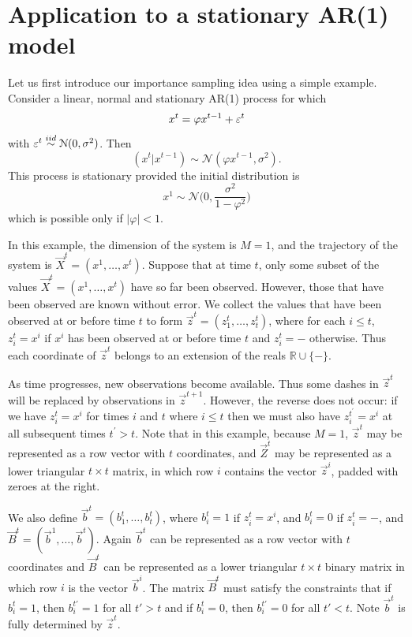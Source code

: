 \section{Application to a stationary AR(1) model}
\label{sec:3}

Let us first introduce our importance sampling idea using a simple example. Consider a linear, normal and stationary AR(1) process for which
\begin{equation*}
    x^{t} = \varphi x^{t-1} + \varepsilon^{t}
\end{equation*}
with $\varepsilon^{t} \stackrel{iid}{\sim} \mathcal{N}(0, \sigma^{2})$. Then
\begin{equation*}
    (x^{t} | x^{t-1}) \sim \mathcal{N} (\varphi x^{t-1}, \sigma^{2}).
\end{equation*}
This process is stationary provided the initial distribution is
\begin{equation*}
    x^{1} \sim \mathcal{N} \Bigg (0, \frac{\sigma^2}{1- \varphi^2} \Bigg )
\end{equation*}
which is possible only if $|\varphi| < 1$. 

In this example, the dimension of the system is $M = 1$, and the trajectory of the system is $\vec {X}^{t} = (x^1, \dots, x^{t})$. Suppose that at time $t$, only some subset of the values $\vec {X}^{t} = (x^1, \dots, x^{t})$ have so far been observed. However, those that have been observed are known without error. We collect the values that have been observed at or before time $t$ to form $\vec{z}^{t} = (z_1^{t}, \dots, z_{t}^{t})$, where for each $i \leq t$, $z_i^{t} = x^i$ if $x^i$ has been observed at or before time $t$ and $z_i^{t} = -$ otherwise. Thus each coordinate of $\vec{z}^{t}$ belongs to an extension of the reals $\mathbb{R} \cup \{ - \}$. 

As time progresses, new observations become available. Thus some dashes in $\vec{z}^{t}$ will be replaced by observations in $\vec{z}^{t+1}$. However, the reverse does not occur: if we have $z_i^{t} = x^i$ for times $i$ and $t$ where $i \leq t$ then we must also have $z_i^{t^{\prime}} = x^i$ at all subsequent times $t^{\prime} > t$. Note that in this example, because $M=1$, $\vec{z}^{t}$ may be represented as a row vector with $t$ coordinates, and $\vec{Z}^{t}$ may be represented as a lower triangular $t \times t$ matrix, in which row $i$ contains the vector $\vec{z}^{i}$, padded with zeroes at the right.

We also define $\vec{b}^{t} = (b_1^{t}, \dots, b_{t}^{t})$, where $b_i^{t} = 1$ if $z_i^{t} = x^i$, and $b_i^{t} = 0$ if $z_i^{t} = -$, and $\vec{B}^{t} = (\vec{b}^{1}, \ldots, \vec{b}^{t})$. Again $\vec{b}^{t}$ can be represented as a row vector with $t$ coordinates and $\vec{B}^{t}$ can be represented as a lower triangular $t \times t$ binary matrix in which row $i$ is the vector $\vec{b}^{i}$. The matrix $\vec{B}^{t}$ must satisfy the constraints that if $b_i^{t} = 1$, then $b_{i}^{t'} = 1$ for all $t' > t$ and if $b_i^{t} = 0$, then $b_{i}^{t'} = 0$ for all $t' < t$. Note $\vec{b}^{t}$ is fully determined by $\vec{z}^{t}$.

